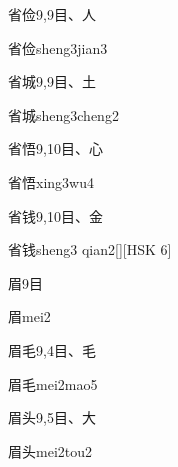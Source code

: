 \begin{Entry}{省俭}{9,9}{⽬、⼈}
  \begin{Phonetics}{省俭}{sheng3jian3}
  \end{Phonetics}
\end{Entry}

\begin{Entry}{省城}{9,9}{⽬、⼟}
  \begin{Phonetics}{省城}{sheng3cheng2}
  \end{Phonetics}
\end{Entry}

\begin{Entry}{省悟}{9,10}{⽬、⼼}
  \begin{Phonetics}{省悟}{xing3wu4}
  \end{Phonetics}
\end{Entry}

\begin{Entry}{省钱}{9,10}{⽬、⾦}
  \begin{Phonetics}{省钱}{sheng3 qian2}[][HSK 6]
  \end{Phonetics}
\end{Entry}

\begin{Entry}{眉}{9}{⽬}
  \begin{Phonetics}{眉}{mei2}
  \end{Phonetics}
\end{Entry}

\begin{Entry}{眉毛}{9,4}{⽬、⽑}
  \begin{Phonetics}{眉毛}{mei2mao5}
  \end{Phonetics}
\end{Entry}

\begin{Entry}{眉头}{9,5}{⽬、⼤}
  \begin{Phonetics}{眉头}{mei2tou2}
  \end{Phonetics}
\end{Entry}

